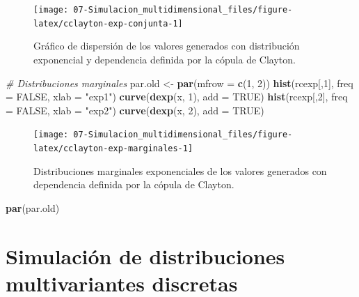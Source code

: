 \documentclass[
]{book}
\newenvironment{Shaded}{\begin{snugshade}}{\end{snugshade}}
\newcommand{\CommentTok}[1]{\textcolor[rgb]{0.56,0.35,0.01}{\textit{#1}}}
\newcommand{\DataTypeTok}[1]{\textcolor[rgb]{0.13,0.29,0.53}{#1}}
\newcommand{\DecValTok}[1]{\textcolor[rgb]{0.00,0.00,0.81}{#1}}
\newcommand{\KeywordTok}[1]{\textcolor[rgb]{0.13,0.29,0.53}{\textbf{#1}}}
\newcommand{\NormalTok}[1]{#1}
\newcommand{\OtherTok}[1]{\textcolor[rgb]{0.56,0.35,0.01}{#1}}
\newcommand{\StringTok}[1]{\textcolor[rgb]{0.31,0.60,0.02}{#1}}
\theoremstyle{break}
\theoremstyle{definition}
\theoremstyle{definition}
\theoremstyle{definition}
\theoremstyle{remark}
\begin{document}
\begin{enumerate}
\begin{figure}[!htb]
  {\centering \texttt{[image: 07-Simulacion\_multidimensional\_files/figure-latex/cclayton-exp-conjunta-1]} 

  }

  \caption{Gráfico de dispersión de los valores generados con distribución exponencial y dependencia definida por la cópula de Clayton.}\label{fig:cclayton-exp-conjunta}
  \end{figure}

\begin{Shaded}
\begin{Highlighting}[]
\CommentTok{# Distribuciones marginales}
\NormalTok{par.old <-}\StringTok{ }\KeywordTok{par}\NormalTok{(}\DataTypeTok{mfrow =} \KeywordTok{c}\NormalTok{(}\DecValTok{1}\NormalTok{, }\DecValTok{2}\NormalTok{))}
\KeywordTok{hist}\NormalTok{(rcexp[,}\DecValTok{1}\NormalTok{], }\DataTypeTok{freq =} \OtherTok{FALSE}\NormalTok{, }\DataTypeTok{xlab =} \StringTok{"exp1"}\NormalTok{)}
\KeywordTok{curve}\NormalTok{(}\KeywordTok{dexp}\NormalTok{(x, }\DecValTok{1}\NormalTok{), }\DataTypeTok{add =} \OtherTok{TRUE}\NormalTok{)}
\KeywordTok{hist}\NormalTok{(rcexp[,}\DecValTok{2}\NormalTok{], }\DataTypeTok{freq =} \OtherTok{FALSE}\NormalTok{, }\DataTypeTok{xlab =} \StringTok{"exp2"}\NormalTok{)}
\KeywordTok{curve}\NormalTok{(}\KeywordTok{dexp}\NormalTok{(x, }\DecValTok{2}\NormalTok{), }\DataTypeTok{add =} \OtherTok{TRUE}\NormalTok{)}
\end{Highlighting}
\end{Shaded}

  \begin{figure}[!htb]

  {\centering \texttt{[image: 07-Simulacion\_multidimensional\_files/figure-latex/cclayton-exp-marginales-1]} 

  }

  \caption{Distribuciones marginales exponenciales de los valores generados con dependencia definida por la cópula de Clayton.}\label{fig:cclayton-exp-marginales}
  \end{figure}

\begin{Shaded}
\begin{Highlighting}[]
\KeywordTok{par}\NormalTok{(par.old)}
\end{Highlighting}
\end{Shaded}
\end{enumerate}

\hypertarget{mult-discr}{%
\section{Simulación de distribuciones multivariantes discretas}\label{mult-discr}}
\end{document}
